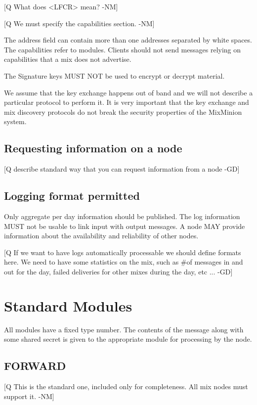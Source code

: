 \documentclass{article}
\begin{document}
[Q What does <LFCR> mean? -NM]

[Q We must specify the capabilities section. -NM]

The address field can contain more than one addresses separated by
white spaces. The capabilities refer to modules. Clients should not 
send messages relying on capabilities that a mix does not advertise.

The Signature keys MUST NOT be used to encrypt or decrypt material.

We assume that the key exchange happens out of band and we will not
describe a particular protocol to perform it. It is very important
that the key exchange and mix discovery protocols do not break the
security properties of the MixMinion system.

\subsection{Requesting information on a node}

[Q describe standard way that you can request information from a
node -GD]

\subsection{Logging format permitted}

Only aggregate per day information should be published. The
log information MUST not be usable to link input with output
messages. A node MAY provide information about the availability and
reliability of other nodes.

[Q If we want to have logs automatically processable we should define
formats here. We need to have some statistics on the mix, such as \#of
messages in and out for the day, failed deliveries for other mixes
during the day, etc ... -GD]

\section{Standard Modules}

All modules have a fixed type number. The contents of the message
along with some shared secret is given to the appropriate module for
processing by the node.

\subsection{FORWARD}

[Q This is the standard one, included only for completeness.  All
mix nodes must support it. -NM]
\end{document}

